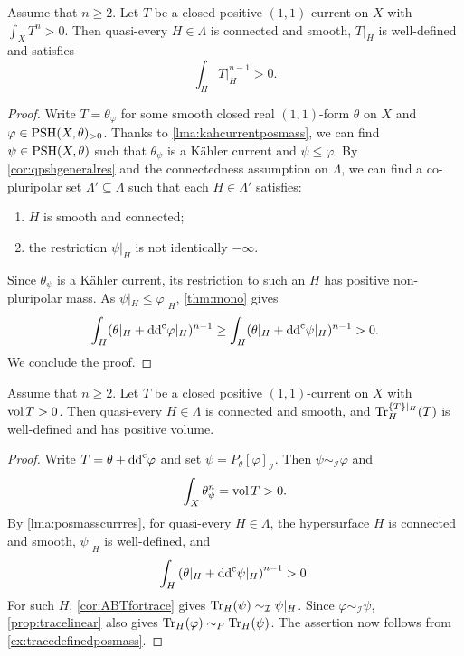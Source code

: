 \begin{lemma}\label{lma:posmasscurrres}
    Assume that $n\geq 2$.
    Let $T$ be a closed positive $(1,1)$-current on $X$ with $\int_X T^n>0$. Then quasi-every $H\in \Lambda$ is connected and smooth, $T|_H$ is well-defined and satisfies
    \[
    \int_H T|_H^{n-1}>0.
    \]
\end{lemma}
\begin{proof}
    Write $T=\theta_{\varphi}$ for some smooth closed real $(1,1)$-form $\theta$ on $X$ and $\varphi\in \mathrm{PSH}(X,\theta)_{>0}$. Thanks to \cref{lma:kahcurrentposmass}, we can find $\psi\in \mathrm{PSH}(X,\theta)$ such that $\theta_{\psi}$ is a K\"ahler current and $\psi\leq \varphi$. By \cref{cor:qpshgeneralres} and the connectedness assumption on $\Lambda$, we can find a co-pluripolar set $\Lambda'\subseteq \Lambda$ such that each $H\in \Lambda'$ satisfies:
    \begin{enumerate}
        \item\label{itm:chapter-trace:L977:1} $H$ is smooth and connected;
        \item\label{itm:chapter-trace:L977:2} the restriction $\psi|_H$ is not identically $-\infty$.
    \end{enumerate}
    Since $\theta_\psi$ is a Kähler current, its restriction to such an $H$ has positive non-pluripolar mass. As $\psi|_H\leq\varphi|_H$, \cref{thm:mono} gives
    \[
        \int_H(\theta|_H+\mathrm{dd}^{\mathrm{c}}\varphi|_H)^{n-1} \geq \int_H(\theta|_H+\mathrm{dd}^{\mathrm{c}}\psi|_H)^{n-1}>0.
    \]
    We conclude the proof.
\end{proof}

\begin{corollary}\label{cor:tracegeneralwelldef}
    Assume that $n\geq 2$. Let $T$ be a closed positive $(1,1)$-current on $X$ with $\operatorname{vol} T>0$. Then quasi-every $H\in \Lambda$ is connected and smooth, and $\operatorname{Tr}_H^{\{T\}|_H}(T)$ is well-defined and has positive volume.
\end{corollary}
\begin{proof}
    Write $T=\theta+\mathrm{dd}^{\mathrm{c}}\varphi$ and set $\psi=P_{\theta}[\varphi]_{\mathcal{I}}$. Then $\psi\sim_{\mathcal{I}}\varphi$ and
    \[
        \int_X \theta_{\psi}^{n}=\operatorname{vol} T>0.
    \]
    By \cref{lma:posmasscurrres}, for quasi-every $H\in \Lambda$, the hypersurface $H$ is connected and smooth, $\psi|_H$ is well-defined, and
    \[
        \int_H \left(\theta|_H+\mathrm{dd}^{\mathrm{c}}\psi|_H\right)^{n-1}>0.
    \]
    For such $H$, \cref{cor:ABTfortrace} gives $\operatorname{Tr}_H(\psi)\sim_{\mathcal{I}}\psi|_H$. Since $\varphi\sim_{\mathcal{I}}\psi$, \cref{prop:tracelinear} also gives $\operatorname{Tr}_H(\varphi)\sim_P\operatorname{Tr}_H(\psi)$. The assertion now follows from \cref{ex:tracedefinedposmass}.
\end{proof}

